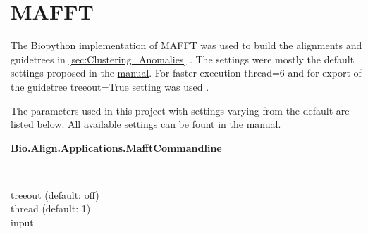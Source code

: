 \section{MAFFT} \label{sec:Clustering_Pipeline}

The Biopython implementation of MAFFT was used to build the alignments and guidetrees in \autoref{sec:Clustering_Anomalies} \autocite{katoh_mafft_2013, cock_biopython_2009}. The settings were mostly the default settings proposed in the \href{https://mafft.cbrc.jp/alignment/software/}{manual}. For faster execution \colorbox{backcolour}{thread=6} and for export of the guidetree \colorbox{backcolour}{treeout=True} setting was used \autocite{katoh_mafft_2013, cock_biopython_2009}. 

The parameters used in this project with settings varying from the default are listed below. All available settings can be fount in the \href{https://mafft.cbrc.jp/alignment/software/}{manual}.

\begin{leftbar}
    \textbf{Bio.Align.Applications.MafftCommandline}
    \begin{nstabbing}
        \qquad\qquad\qquad\qquad\qquad\quad\=\kill
    
        treeout \> (default: off)\\
        
        thread \> (default: 1)\\
        
        input \>
        
    \end{nstabbing}
\end{leftbar}

